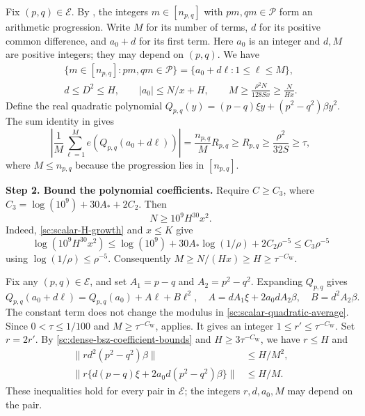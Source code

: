 \documentclass[twoside]{aomart}
\makeatletter
\theoremstyle{paperplain}
\theoremstyle{paperdefinition}
\renewenvironment{proof}[1][\proofname]{\par\pushQED{\qed}%
  \normalfont\topsep6\p@\@plus3\p@\relax\trivlist
  \item[\hskip\labelsep\itshape #1\@addpunct{.}]\ignorespaces
}{\popQED\endtrivlist\@endpefalse}
\numberwithin{equation}{section}
\makeatother
\begin{document}
\begin{proof}
Fix $(p,q)\in\mathcal E$. By ,
the integers $m\in[n_{p,q}]$ with $pm,qm\in\mathcal P$
form an arithmetic progression. Write $M$ for its number of
terms, $d$ for its positive common difference, and $a_0+d$
for its first term. Here $a_0$ is an integer and $d,M$
are positive integers; they may depend on $(p,q)$. We have
\begin{equation}
 \begin{gathered}
 \{m\in[n_{p,q}]:pm,qm\in\mathcal P\}
       =\{a_0+d\ell:1\le\ell\le M\},\\
 d\le D^2\le H,\qquad |a_0|\le N/x+H,\qquad
 M\ge\frac{\rho^2N}{128Sx}\ge\frac{N}{Hx}.
 \end{gathered}
 \label{sc:scalar-cross-progression-data}
\end{equation}
Define the real quadratic polynomial
$Q_{p,q}(y)=(p-q)\xi y+(p^2-q^2)\beta y^2$.
The sum identity in  gives
\begin{equation}
 \left|\frac1M\sum_{\ell=1}^M e(Q_{p,q}(a_0+d\ell))\right|
 =\frac{n_{p,q}}{M}R_{p,q}
 \ge R_{p,q}\ge\frac{\rho^2}{32S}\ge\tau,
 \label{sc:scalar-quadratic-average}
\end{equation}
where $M\le n_{p,q}$ because the progression lies in $[n_{p,q}]$.

\par
\medskip
\noindent\textbf{Step 2. Bound the polynomial coefficients.}
Require $C\ge C_3$, where
$C_3=\log(10^9)+30A_*+2C_2$. Then
\begin{equation}
 N\ge10^9H^{30}x^2.
 \label{sc:scalar-size-for-coefficients}
\end{equation}
Indeed, \eqref{sc:scalar-H-growth} and $x\le K$ give
\begin{equation*}
 \log(10^9H^{30}x^2)
 \le\log(10^9)+30A_*\log(1/\rho)+2C_2\rho^{-5}
 \le C_3\rho^{-5}
\end{equation*}
using $\log(1/\rho)\le\rho^{-5}$. Consequently
$M\ge N/(Hx)\ge H\ge\tau^{-C_{\mathrm W}}$.

Fix any $(p,q)\in\mathcal E$, and set $A_1=p-q$ and $A_2=p^2-q^2$.
Expanding $Q_{p,q}$ gives
\begin{equation*}
 Q_{p,q}(a_0+d\ell)=Q_{p,q}(a_0)+A\ell+B\ell^2,
 \quad A=dA_1\xi+2a_0dA_2\beta,\quad B=d^2A_2\beta.
\end{equation*}
The constant term does not change the modulus in
\eqref{sc:scalar-quadratic-average}. Since $0<\tau\le1/100$ and
$M\ge\tau^{-C_{\mathrm W}}$,  applies.
It gives an integer $1\le r'\le\tau^{-C_{\mathrm W}}$.
Set $r=2r'$. By \eqref{sc:dense-bsz-coefficient-bounds} and
$H\ge3\tau^{-C_{\mathrm W}}$, we have $r\le H$ and
\begin{align}
 \|rd^2(p^2-q^2)\beta\|&\le H/M^2,
 \\
 \|r\{d(p-q)\xi+2a_0d(p^2-q^2)\beta\}\|&\le H/M.
 \label{sc:dense-bsz-scalar-linear-input}
\end{align}
These inequalities hold for every pair in $\mathcal E$; the integers
$r,d,a_0,M$ may depend on the pair.


\end{proof}
\end{document}

